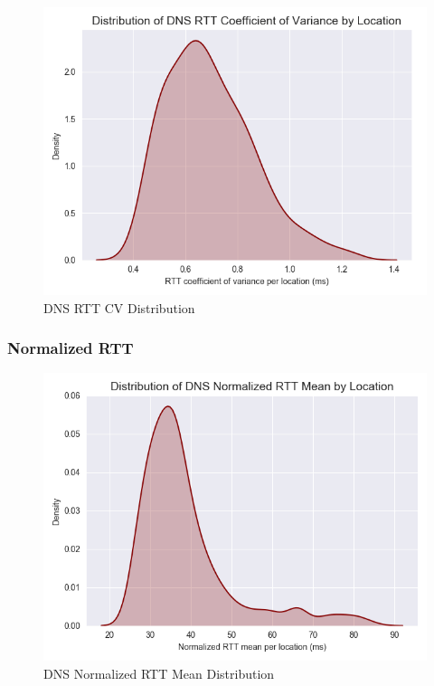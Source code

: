 \begin{figure}[H]
    \centering
    \includegraphics[width=\textwidth]{images/dns/dist_raw_data/dns_rtt_cv_distribution.png}
    \caption{DNS RTT CV Distribution}
    \label{fig:dns_analytics_cv_dist}
\end{figure}

\subsubsection{Normalized RTT}
\begin{figure}[H]
    \centering
    \includegraphics[width=\textwidth]{images/dns/dist_raw_data/dns_norm_rtt_mean_distribution.png}
    \caption{DNS Normalized RTT Mean Distribution}
    \label{fig:dns_analytics_norm_mean_dist}
\end{figure}

